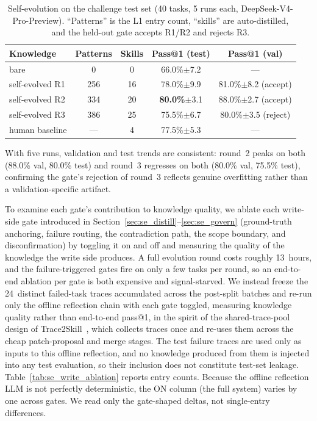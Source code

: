 \documentclass[conference]{IEEEtran}
\begin{document}
\begin{table}[h]
\caption{Self-evolution on the challenge test set (40 tasks, 5 runs each, DeepSeek-V4-Pro-Preview). ``Patterns'' is the L1 entry count, ``skills'' are auto-distilled, and the held-out gate accepts R1/R2 and rejects R3.}
\label{tab:sevolution}
\setlength{\tabcolsep}{4pt}
\centering
\footnotesize
\begin{tabular}{lcccc}
\toprule
Knowledge & Patterns & Skills & Pass@1 (test) & Pass@1 (val) \\
\midrule
bare          & 0   & 0  & 66.0\%$\pm$7.2  & --- \\
self-evolved R1 & 256 & 16 & 78.0\%$\pm$9.9  & 81.0\%$\pm$8.2 (accept) \\
self-evolved R2 & 334 & 20 & \textbf{80.0\%}$\pm$3.1  & 88.0\%$\pm$2.7 (accept) \\
self-evolved R3 & 386 & 25 & 75.5\%$\pm$6.7  & 80.0\%$\pm$3.5 (reject) \\
\midrule
human baseline & --- & 4  & 77.5\%$\pm$5.3  & --- \\
\bottomrule
\end{tabular}
\end{table}

With five runs, validation and test trends are consistent: round~2 peaks on both (88.0\% val, 80.0\% test) and round~3 regresses on both (80.0\% val, 75.5\% test), confirming the gate's rejection of round~3 reflects genuine overfitting rather than a validation-specific artifact.

To examine each gate's contribution to knowledge quality, we ablate each write-side gate introduced in Section~\ref{sec:se_distill}--\ref{sec:se_govern} (ground-truth anchoring, failure routing, the contradiction path, the scope boundary, and disconfirmation) by toggling it on and off and measuring the quality of the knowledge the write side produces. A full evolution round costs roughly 13~hours, and the failure-triggered gates fire on only a few tasks per round, so an end-to-end ablation per gate is both expensive and signal-starved. We instead freeze the 24~distinct failed-task traces accumulated across the post-split batches and re-run only the offline reflection chain with each gate toggled, measuring knowledge quality rather than end-to-end pass@1, in the spirit of the shared-trace-pool design of Trace2Skill~\cite{ni2026trace2skill}, which collects traces once and re-uses them across the cheap patch-proposal and merge stages. The test failure traces are used only as inputs to this offline reflection, and no knowledge produced from them is injected into any test evaluation, so their inclusion does not constitute test-set leakage. Table~\ref{tab:se_write_ablation} reports entry counts. Because the offline reflection LLM is not perfectly deterministic, the ON column (the full system) varies by one across gates. We read only the gate-shaped deltas, not
single-entry differences.
\end{document}
